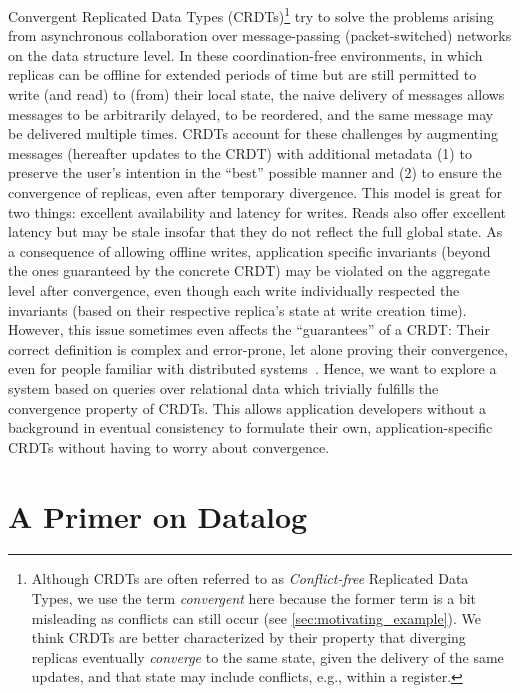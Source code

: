 \documentclass{article}
\begin{document}
Convergent Replicated Data Types (CRDTs)\footnote{
	Although CRDTs are often referred to as \emph{Conflict-free} Replicated
	Data Types, we use the term \emph{convergent} here because the former term
	is a bit misleading as conflicts can still occur
	(see \autoref{sec:motivating_example}).
	We think CRDTs are better characterized by their property that diverging
	replicas eventually \emph{converge} to the same state,
	given the delivery of the same updates,
	and that state may include conflicts, e.g., within a register.
} try to solve the problems arising from asynchronous collaboration over
message-passing (packet-switched) networks on the data structure level.
In these coordination-free environments, in which replicas can be offline
for extended periods of time but are still permitted to write (and read)
to (from) their local state,
the naive delivery of messages allows messages to be arbitrarily delayed,
to be reordered, and the same message may be delivered multiple times.
CRDTs account for these challenges by augmenting messages (hereafter updates
to the CRDT) with additional metadata (1) to preserve the user's intention
in the ``best'' possible manner and (2) to ensure the convergence of replicas,
even after temporary divergence.
This model is great for two things: excellent availability and latency for writes.
Reads also offer excellent latency but may be stale insofar that they do not
reflect the full global state.
As a consequence of allowing offline writes,
application specific invariants (beyond the ones guaranteed by the concrete CRDT)
may be violated on the aggregate level after convergence,
even though each write individually respected the invariants (based on their
respective replica's state at write creation time).
However, this issue sometimes even affects the ``guarantees'' of a CRDT:
Their correct definition is complex and error-prone,
let alone proving their convergence, even for people familiar with distributed
systems~\cite{kleppmann2022assessing, gomes2017verifying}.
Hence, we want to explore a system based on queries over relational data
which trivially fulfills the convergence property of CRDTs.
This allows application developers without a background in eventual
consistency to formulate their own, application-specific CRDTs without
having to worry about convergence.

\section{A Primer on Datalog}
\label{sec:primer_datalog}
\end{document}
